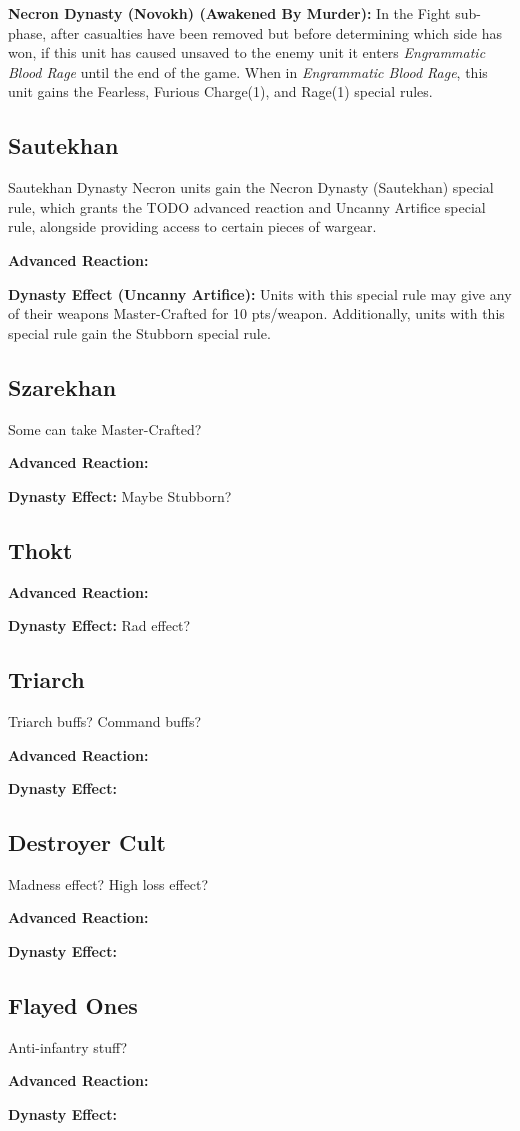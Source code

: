 \textbf{Necron Dynasty (Novokh) (Awakened By Murder):} In the Fight sub-phase, after casualties have been removed but before determining which side has won, if this unit has caused unsaved to the enemy unit it enters \textit{Engrammatic Blood Rage} until the end of the game. When in \textit{Engrammatic Blood Rage}, this unit gains the Fearless, Furious Charge(1), and Rage(1) special rules.

\subsection{Sautekhan}

Sautekhan Dynasty Necron units gain the Necron Dynasty (Sautekhan) special rule, which grants the TODO advanced reaction and Uncanny Artifice special rule, alongside providing access to certain pieces of wargear.

\textbf{Advanced Reaction:}

\textbf{Dynasty Effect (Uncanny Artifice):} Units with this special rule may give any of their weapons Master-Crafted for 10 pts/weapon. Additionally, units with this special rule gain the Stubborn special rule.


\subsection{Szarekhan}

Some can take Master-Crafted?

\textbf{Advanced Reaction:}

\textbf{Dynasty Effect:} Maybe Stubborn?


\subsection{Thokt}

\textbf{Advanced Reaction:}

\textbf{Dynasty Effect:} Rad effect?


\subsection{Triarch}

Triarch buffs? Command buffs?

\textbf{Advanced Reaction:}

\textbf{Dynasty Effect:}


\subsection{Destroyer Cult}

Madness effect? High loss effect?

\textbf{Advanced Reaction:}

\textbf{Dynasty Effect:}


\subsection{Flayed Ones}

Anti-infantry stuff?

\textbf{Advanced Reaction:}

\textbf{Dynasty Effect:}